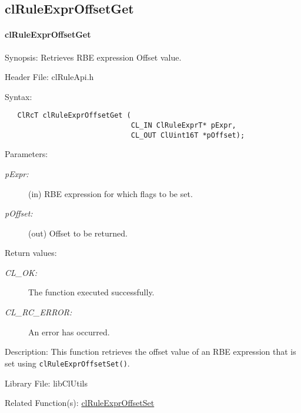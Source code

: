 \begin{flushleft}
\subsection{clRuleExprOffsetGet}
\hypertarget{pagerule114}{}\paragraph{cl\-Rule\-Expr\-Offset\-Get}\label{pagerule114}
\begin{Desc}
\item[Synopsis:]Retrieves RBE expression Offset value.\end{Desc}
\begin{Desc}
\item[Header File:]clRuleApi.h\end{Desc}
\begin{Desc}
\item[Syntax:]

\footnotesize\begin{verbatim}   ClRcT clRuleExprOffsetGet (
                              CL_IN ClRuleExprT* pExpr,
                              CL_OUT ClUint16T *pOffset);
\end{verbatim}
\normalsize
\end{Desc}
\begin{Desc}
\item[Parameters:]
\begin{description}
\item[{\em p\-Expr:}](in) RBE expression for which flags to be set. \item[{\em p\-Offset:}](out) Offset to be returned.\end{description}
\end{Desc}
\begin{Desc}
\item[Return values:]
\begin{description}
\item[{\em CL\_\-OK:}]The function executed successfully. \item[{\em CL\_\-RC\_\-ERROR:}]An error has occurred.\end{description}
\end{Desc}
\begin{Desc}
\item[Description:]This function retrieves the offset value of an RBE expression that is set using {\tt{clRuleExprOffsetSet()}}.\end{Desc}
\begin{Desc}
\item[Library File:]lib\-Cl\-Utils\end{Desc}
\begin{Desc}
\item[Related Function(s):]\hyperlink{pagerule110}{cl\-Rule\-Expr\-Offset\-Set} \end{Desc}
\newpage



\end{flushleft}
